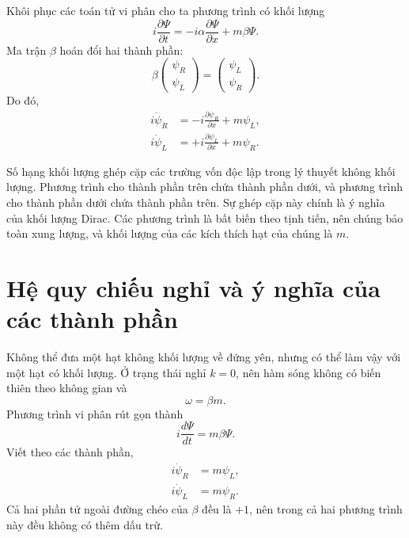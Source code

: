 Khôi phục các toán tử vi phân cho ta phương trình có khối lượng
\begin{equation}
i\frac{\partial\Psi}{\partial t}
=
-i\alpha\frac{\partial\Psi}{\partial x}
+m\beta\Psi.
\end{equation}
Ma trận \(\beta\) hoán đổi hai thành phần:
\begin{equation}
\beta
\begin{pmatrix}
\psi_R\\
\psi_L
\end{pmatrix}
=
\begin{pmatrix}
\psi_L\\
\psi_R
\end{pmatrix}.
\end{equation}
Do đó,
\begin{align}
i\dot{\psi}_R
&=-i\frac{\partial\psi_R}{\partial x}+m\psi_L,\\
i\dot{\psi}_L
&=+i\frac{\partial\psi_L}{\partial x}+m\psi_R.
\end{align}

Số hạng khối lượng ghép cặp các trường vốn độc lập trong lý thuyết không khối lượng. Phương trình cho thành phần trên chứa thành phần dưới, và phương trình cho thành phần dưới chứa thành phần trên. Sự ghép cặp này chính là ý nghĩa của khối lượng Dirac. Các phương trình là bất biến theo tịnh tiến, nên chúng bảo toàn xung lượng, và khối lượng của các kích thích hạt của chúng là \(m\).

\begin{classroomqa}
\end{classroomqa}

\section{Hệ quy chiếu nghỉ và ý nghĩa của các thành phần}

Không thể đưa một hạt không khối lượng về đứng yên, nhưng có thể làm vậy với một hạt có khối lượng. Ở trạng thái nghỉ \(k=0\), nên hàm sóng không có biến thiên theo không gian và
\begin{equation}
\omega=\beta m.
\end{equation}
Phương trình vi phân rút gọn thành
\begin{equation}
i\frac{d\Psi}{dt}=m\beta\Psi.
\end{equation}
Viết theo các thành phần,
\begin{align}
i\dot{\psi}_R&=m\psi_L,\\
i\dot{\psi}_L&=m\psi_R.
\end{align}
Cả hai phần tử ngoài đường chéo của \(\beta\) đều là \(+1\), nên trong cả hai phương trình này đều không có thêm dấu trừ.

